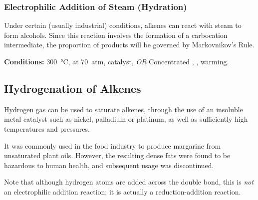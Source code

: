 		\pagebreak
		\subsubsection{Electrophilic Addition of Steam (Hydration)}

			Under certain (usually industrial) conditions, alkenes can react with steam to form alcohols. Since this reaction involves
			the formation of a carbocation intermediate, the proportion of products will be governed by Markovnikov's Rule.

			\vspace{1.5em}
			\vbox{\textbf{Conditions:}	\tabto{35mm}\SI{300}{\celsius}, at \SI{70}{atm},  catalyst, \textit{OR}
										\tabto{35mm}Concentrated , , warming.}






	\subsection{Hydrogenation of Alkenes}

		Hydrogen gas can be used to saturate alkenes, through the use of an insoluble metal catalyst such as nickel, palladium or platinum,
		as well as sufficiently high temperatures and pressures.

		It was commonly used in the food industry to produce margarine from unsaturated plant oils. However, the resulting dense fats were
		found to be hazardous to human health, and subsequent usage was discontinued.

		Note that although hydrogen atoms are added across the double bond, this is \textit{not} an electrophilic addition reaction; it
		is actually a reduction-addition reaction.




